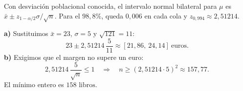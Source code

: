 Con desviación poblacional conocida, el intervalo normal bilateral para $\mu$ es $\bar x\pm z_{1-\alpha/2}\sigma/\sqrt n$. Para el $98{,}8\%$, queda $0{,}006$ en cada cola y $z_{0{,}994}\approx 2{,}51214$.

\textbf{a)} Sustituimos $\bar x=23$, $\sigma=5$ y $\sqrt{121}=11$:
\[
23\pm 2{,}51214\,\frac{5}{11}\approx \boxed{[21{,}86,\ 24{,}14]}\ \text{euros}.
\]
\textbf{b)} Exigimos que el margen no supere un euro:
\[
2{,}51214\,\frac{5}{\sqrt n}\le 1
\quad\Longrightarrow\quad n\ge (2{,}51214\cdot5)^2\approx157{,}77.
\]
El mínimo entero es $\boxed{158\text{ libros}}$.
